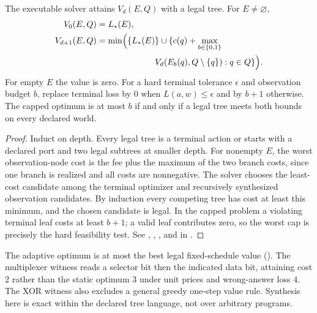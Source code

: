 \begin{theorem}\label{thm:investigation}
The executable solver attains $V_d(E,Q)$ with a legal tree. For $E\ne\varnothing$,
\begin{align}
 V_0(E,Q)&=L_*(E),\\
 V_{d+1}(E,Q)&=\min\Bigl(\{L_*(E)\}\cup\{c(q)+\max_{b\in\{0,1\}} \\
 &\hspace{24mm} V_d(E_b(q),Q\setminus\{q\}):q\in Q\}\Bigr).
\end{align}
For empty $E$ the value is zero. For a hard terminal tolerance $\epsilon$ and observation budget $b$, replace terminal loss by $0$ when $L(a,w)\le\epsilon$ and by $b+1$ otherwise. The capped optimum is at most $b$ if and only if a legal tree meets both bounds on every declared world.
\end{theorem}
\begin{proof}
Induct on depth. Every legal tree is a terminal action or starts with a declared port and two legal subtrees at smaller depth. For nonempty $E$, the worst observation-node cost is the fee plus the maximum of the two branch costs, since one branch is realized and all costs are nonnegative. The solver chooses the least-cost candidate among the terminal optimizer and recursively synthesized observation candidates. By induction every competing tree has cost at least this minimum, and the chosen candidate is legal. In the capped problem a violating terminal leaf costs at least $b+1$; a valid leaf contributes zero, so the worst cap is precisely the hard feasibility test. See , , , and  in .
\end{proof}
The adaptive optimum is at most the best legal fixed-schedule value (). The multiplexer witness reads a selector bit then the indicated data bit, attaining cost $2$ rather than the static optimum $3$ under unit prices and wrong-answer loss $4$. The XOR witness also excludes a general greedy one-step value rule. Synthesis here is exact within the declared tree language, not over arbitrary programs.

